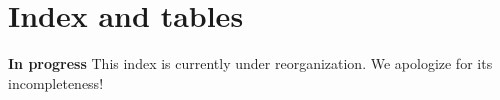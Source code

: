 \documentclass[twoside,a4paper]{book}
\begin{document}







\chapter{Index and tables}

{\Large \textbf{In progress} This index is currently under reorganization.  We apologize for its incompleteness! }








\end{document}
